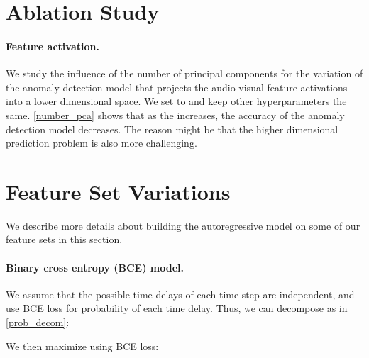 \documentclass[10pt,twocolumn,letterpaper]{article}
\newcommand{\mypar}[1]{\vspace{-3mm}\paragraph{#1}}
\begin{document}
\section{Ablation Study}
\paragraph{Feature activation. }
We study the influence of the number of principal components  for the variation of the anomaly detection model that projects the audio-visual feature activations into a lower dimensional space. We set  to  and keep other hyperparameters the same. \cref{number_pca} shows that as the  increases, the accuracy of the anomaly detection model decreases. The reason might be that the higher dimensional prediction problem is also more challenging. 




\section{Feature Set Variations}
\label{appendix:feature_set}
We describe more details about building the autoregressive model on some of our feature sets in this section.

\mypar{Binary cross entropy (BCE) model.} 
We assume that the  possible time delays of each time step are independent, and use BCE loss for probability  of each time delay.  
Thus, we can decompose  as in \cref{prob_decom}:

We then maximize  using BCE loss:
\end{document}
